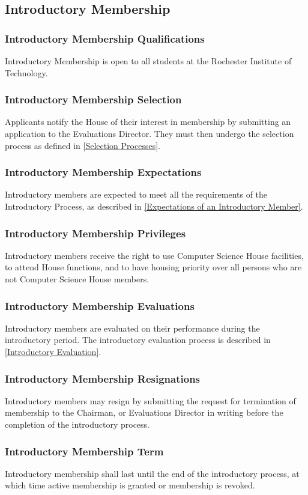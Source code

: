\documentclass{article}
\newcommand{\asection}[1]{\subsection{#1} \label{#1}}
\newcommand{\asubsection}[1]{\subsubsection{#1} \label{#1}}
\begin{document}
\asection{Introductory Membership}
\asubsection{Introductory Membership Qualifications}
Introductory Membership is open to all students at the Rochester Institute of Technology.
\asubsection{Introductory Membership Selection}
Applicants notify the House of their interest in membership by submitting an application to the Evaluations Director. They must then undergo the selection process as defined in \ref{Selection Processes}.
\asubsection{Introductory Membership Expectations}
Introductory members are expected to meet all the requirements of the Introductory Process, as described in \ref{Expectations of an Introductory Member}.
\asubsection{Introductory Membership Privileges}
Introductory members receive the right to use Computer Science House facilities, to attend House functions, and to have housing priority over all persons who are not Computer Science House members.
\asubsection{Introductory Membership Evaluations}
Introductory members are evaluated on their performance during the introductory period. The introductory evaluation process is described in \ref{Introductory Evaluation}.
\asubsection{Introductory Membership Resignations}
Introductory members may resign by submitting the request for termination of membership to the Chairman, or Evaluations Director in writing before the completion of the introductory process.
\asubsection{Introductory Membership Term}
Introductory membership shall last until the end of the introductory process, at which time active membership is granted or membership is revoked.
\end{document}
